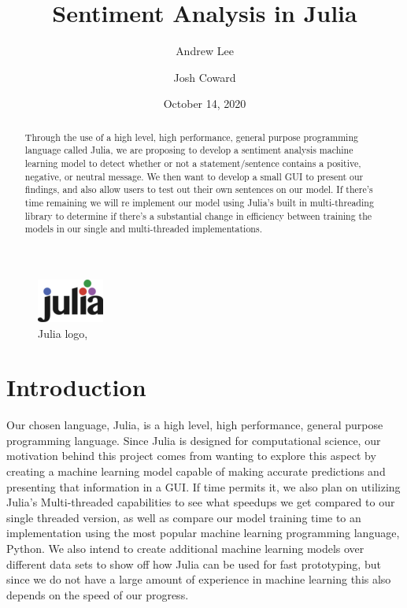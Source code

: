 \documentclass{article}
\title{Sentiment Analysis in Julia}
\author{Andrew Lee \\ \href{mailto:andrewlee733@u.boisestate.edu}{\color{blue}{andrewlee733@u.boisestate.edu}}
    \and Josh Coward \\ \href{mailto:joshcoward@u.boisestate.edu}{\color{blue}{joshcoward@u.boisestate.edu}} }
\date{October 14, 2020}
\begin{document}
\maketitle

\begin{abstract}
Through the use of a high level, high performance, general purpose programming language called Julia, we are proposing to develop a sentiment analysis machine learning model to detect whether or not a statement/sentence contains a positive, negative, or neutral message. We then want to develop a small GUI to present our findings, and also allow users to test out their own sentences on our model. If there's time remaining we will re implement our model using Julia's built in multi-threading library to determine if there's a substantial change in efficiency between training the models in our single and multi-threaded implementations.
\end{abstract}

\begin{figure}[h]
\caption{Julia logo, \protect\cite{Julia2020}}
\begin{center}
\includegraphics{juliaLogo}
\end{center}
\end{figure}

\section{Introduction}
Our chosen language, Julia, is a high level, high performance, general purpose programming language. Since Julia is designed for computational science, our motivation behind this project comes from wanting to explore this aspect by creating a machine learning model capable of making accurate predictions and presenting that information in a GUI. If time permits it, we also plan on utilizing Julia's Multi-threaded capabilities to see what speedups we get compared to our single threaded version, as well as compare our model training time to an implementation using the most popular machine learning programming language, Python. We also intend to create additional machine learning models over different data sets to show off how Julia can be used for fast prototyping, but since we do not have a large amount of experience in machine learning this also depends on the speed of our progress.
\end{document}
